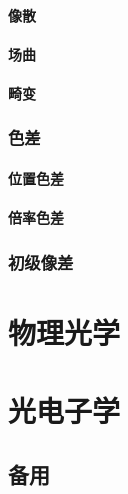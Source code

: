 \documentclass[cn,10pt,chinesefont=founder,math=newtx,cite=super,twoside]{elegantbook}
\begin{document}
\subsection{像散}
\subsection{场曲}
\subsection{畸变}
\section{色差}
\subsection{位置色差}
\subsection{倍率色差}
\section{初级像差}
\part{物理光学}

\part{光电子学}

%
\appendix
\chapter{备用}
\end{document}
